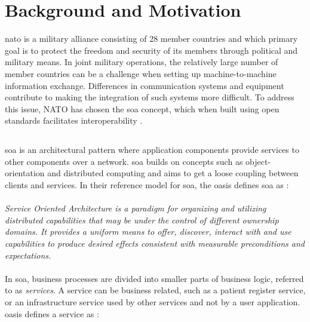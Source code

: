 \section{Background and Motivation}

\gls{nato} is a military alliance consisting of 28 member countries
\cite{nato-homepage-member-countries} and which primary goal is to protect the
freedom and security of its members through political and military means. In
joint military operations, the relatively large number of member countries can
be a challenge when setting up machine-to-machine information exchange.
Differences in communication systems and equipment contribute to making the
integration of such systems more difficult. To address this issue, NATO has
chosen the \gls{soa} concept, which when built using open standards facilitates
interoperability \cite{nnec-study}.

\subsection{}

\gls{soa} is an architectural pattern where application components provide
services to other components over a network. \gls{soa} builds on concepts such
as object-orientation and distributed computing and aims to get a loose coupling
between clients and services. In their reference model for \gls{soa}, the
\gls{oasis} defines \gls{soa} as \cite{oasis-soa-reference-model}:

\paragraph{}

\textit{Service Oriented Architecture is a paradigm for organizing and utilizing
distributed capabilities that may be under the control of different ownership
domains. It provides a uniform means to offer, discover, interact with and use
capabilities to produce desired effects consistent with measurable preconditions
and expectations.}

\paragraph{}

In \gls{soa}, business processes are divided into smaller parts of business
logic, referred to as \textit{services}. A service can be business related, such
as a patient register service, or an infrastructure service used by other
services and not by a user application. \gls{oasis} defines a service as
\cite{oasis-soa-reference-model}:

